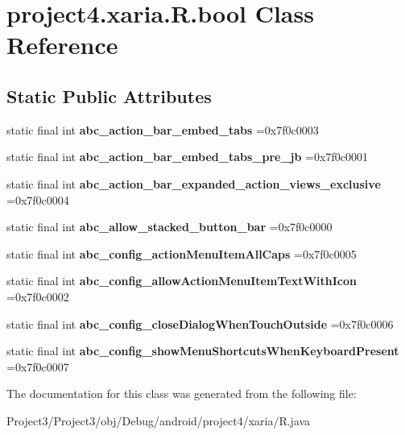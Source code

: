 \hypertarget{classproject4_1_1xaria_1_1R_1_1bool}{}\section{project4.\+xaria.\+R.\+bool Class Reference}
\label{classproject4_1_1xaria_1_1R_1_1bool}
\subsection*{Static Public Attributes}
\begin{DoxyCompactItemize}
\item 
\mbox{\label{classproject4_1_1xaria_1_1R_1_1bool_a321ba996f79e78953d3d17a45852b76f}} 
static final int {\bfseries abc\+\_\+action\+\_\+bar\+\_\+embed\+\_\+tabs} =0x7f0c0003
\item 
\mbox{\label{classproject4_1_1xaria_1_1R_1_1bool_aad1a4abbffd5ac88d20186f7eddd0547}} 
static final int {\bfseries abc\+\_\+action\+\_\+bar\+\_\+embed\+\_\+tabs\+\_\+pre\+\_\+jb} =0x7f0c0001
\item 
\mbox{\label{classproject4_1_1xaria_1_1R_1_1bool_a4bcab2189209d5067d4dd5a08643d5ce}} 
static final int {\bfseries abc\+\_\+action\+\_\+bar\+\_\+expanded\+\_\+action\+\_\+views\+\_\+exclusive} =0x7f0c0004
\item 
\mbox{\label{classproject4_1_1xaria_1_1R_1_1bool_a49c12bdc2f097f416226609773346f48}} 
static final int {\bfseries abc\+\_\+allow\+\_\+stacked\+\_\+button\+\_\+bar} =0x7f0c0000
\item 
\mbox{\label{classproject4_1_1xaria_1_1R_1_1bool_aa0dacf46b02c1ef9088a622df1019eaa}} 
static final int {\bfseries abc\+\_\+config\+\_\+action\+Menu\+Item\+All\+Caps} =0x7f0c0005
\item 
\mbox{\label{classproject4_1_1xaria_1_1R_1_1bool_a58d1fd7db63152ecd43a21e90f05085f}} 
static final int {\bfseries abc\+\_\+config\+\_\+allow\+Action\+Menu\+Item\+Text\+With\+Icon} =0x7f0c0002
\item 
\mbox{\label{classproject4_1_1xaria_1_1R_1_1bool_a3974dd42bae24efcbb6804321432e881}} 
static final int {\bfseries abc\+\_\+config\+\_\+close\+Dialog\+When\+Touch\+Outside} =0x7f0c0006
\item 
\mbox{\label{classproject4_1_1xaria_1_1R_1_1bool_a6e0a1c21e2039c366a14154840ce3696}} 
static final int {\bfseries abc\+\_\+config\+\_\+show\+Menu\+Shortcuts\+When\+Keyboard\+Present} =0x7f0c0007
\end{DoxyCompactItemize}


The documentation for this class was generated from the following file\+:\begin{DoxyCompactItemize}
\item 
Project3/\+Project3/obj/\+Debug/android/project4/xaria/R.\+java\end{DoxyCompactItemize}
